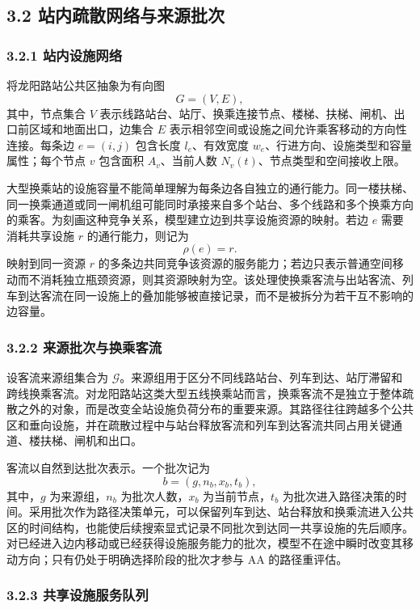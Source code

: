 \documentclass[UTF8,a4paper,12pt]{ctexart}
\begin{document}
\subsection{3.2 站内疏散网络与来源批次}

\subsubsection{3.2.1 站内设施网络}

将龙阳路站公共区抽象为有向图
\[
G=(V,E),
\]
其中，节点集合 \(V\) 表示线路站台、站厅、换乘连接节点、楼梯、扶梯、闸机、出口前区域和地面出口，边集合 \(E\) 表示相邻空间或设施之间允许乘客移动的方向性连接。每条边 \(e=(i,j)\) 包含长度 \(l_e\)、有效宽度 \(w_e\)、行进方向、设施类型和容量属性；每个节点 \(v\) 包含面积 \(A_v\)、当前人数 \(N_v(t)\)、节点类型和空间接收上限。

大型换乘站的设施容量不能简单理解为每条边各自独立的通行能力。同一楼扶梯、同一换乘通道或同一闸机组可能同时承接来自多个站台、多个线路和多个换乘方向的乘客。为刻画这种竞争关系，模型建立边到共享设施资源的映射。若边 \(e\) 需要消耗共享设施 \(r\) 的通行能力，则记为
\[
\rho(e)=r.
\]
映射到同一资源 \(r\) 的多条边共同竞争该资源的服务能力；若边只表示普通空间移动而不消耗独立瓶颈资源，则其资源映射为空。该处理使换乘客流与出站客流、列车到达客流在同一设施上的叠加能够被直接记录，而不是被拆分为若干互不影响的边容量。

\subsubsection{3.2.2 来源批次与换乘客流}

设客流来源组集合为 \(\mathcal{G}\)。来源组用于区分不同线路站台、列车到达、站厅滞留和跨线换乘客流。对龙阳路站这类大型五线换乘站而言，换乘客流不是独立于整体疏散之外的对象，而是改变全站设施负荷分布的重要来源。其路径往往跨越多个公共区和垂向设施，并在疏散过程中与站台释放客流和列车到达客流共同占用关键通道、楼扶梯、闸机和出口。

客流以自然到达批次表示。一个批次记为
\[
b=(g,n_b,x_b,t_b),
\]
其中，\(g\) 为来源组，\(n_b\) 为批次人数，\(x_b\) 为当前节点，\(t_b\) 为批次进入路径决策的时间。采用批次作为路径决策单元，可以保留列车到达、站台释放和换乘流进入公共区的时间结构，也能使后续搜索显式记录不同批次到达同一共享设施的先后顺序。对已经进入边内移动或已经获得设施服务能力的批次，模型不在途中瞬时改变其移动方向；只有仍处于明确选择阶段的批次才参与 AA 的路径重评估。

\subsubsection{3.2.3 共享设施服务队列}
\end{document}
